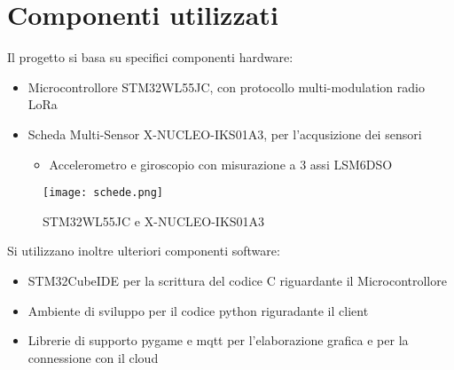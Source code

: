 \section{Componenti utilizzati}
Il progetto si basa su specifici componenti hardware:
\begin{itemize}
  \item Microcontrollore STM32WL55JC, con protocollo multi-modulation radio LoRa
  \item Scheda Multi-Sensor X-NUCLEO-IKS01A3, per l'acqusizione dei sensori
        \begin{itemize}
          \item Accelerometro e giroscopio con misurazione a 3 assi LSM6DSO
        \end{itemize}
\end{itemize}
\begin{figure}[h!]
  \centering
  \texttt{[image: schede.png]}
  \caption{STM32WL55JC e X-NUCLEO-IKS01A3}
\end{figure}
Si utilizzano inoltre ulteriori componenti software:
\begin{itemize}
  \item STM32CubeIDE per la scrittura del codice C riguardante il Microcontrollore
  \item Ambiente di sviluppo per il codice python riguradante il client
  \item Librerie di supporto pygame e mqtt per l'elaborazione grafica e per la connessione con il cloud
\end{itemize}


